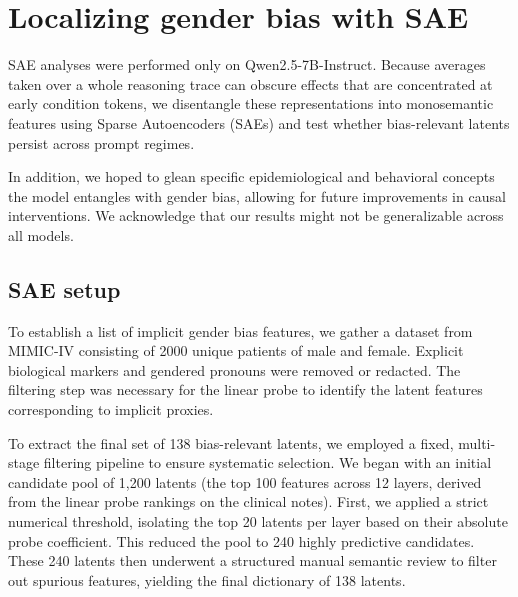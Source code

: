 \documentclass{article}
\begin{document}

\section{Localizing gender bias with SAE}
\label{sec:sae}
SAE analyses were performed only on Qwen2.5-7B-Instruct. Because averages taken over a whole reasoning trace can obscure effects that are concentrated at early condition tokens, we disentangle these representations into monosemantic features using Sparse Autoencoders (SAEs) and test whether bias-relevant latents persist across prompt regimes.

In addition, we hoped to glean specific epidemiological and behavioral concepts the model entangles with gender bias, allowing for future improvements in causal interventions. We acknowledge that our results might not be generalizable across all models.


\subsection{SAE setup}
To establish a list of implicit gender bias features, we gather a dataset from MIMIC-IV consisting of 2000 unique patients of male and female. Explicit biological markers and gendered pronouns were removed or redacted. The filtering step was necessary for the linear probe to identify the latent features corresponding to implicit proxies. 


To extract the final set of 138 bias-relevant latents, we employed a fixed, multi-stage filtering pipeline to ensure systematic selection. We began with an initial candidate pool of 1,200 latents (the top 100 features across 12 layers, derived from the linear probe rankings on the clinical notes). First, we applied a strict numerical threshold, isolating the top 20 latents per layer based on their absolute probe coefficient. This reduced the pool to 240 highly predictive candidates. These 240 latents then underwent a structured manual semantic review to filter out spurious features, yielding the final dictionary of 138 latents.
\end{document}
